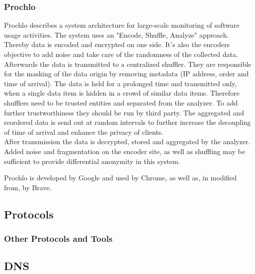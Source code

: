 \subsubsection{Prochlo}
    Prochlo describes a system architecture for large-scale monitoring of software usage activities. The system uses an "Encode, Shuffle, Analyze" approach. Thereby data is encoded and encrypted on one side. It's also the encoders objective to add noise and take care of the randomness of the collected data\cite{bittau_prochlo_2017}.\\
    Afterwards the data is transmitted to a centralized shuffler. They are responsible for the masking of the data origin by removing metadata (IP address, order and time of arrival).
    The data is held for a prolonged time and transmitted only, when a single data item is hidden in a crowd of similar data items. Therefore shufflers need to be trusted entities and separated from the analyzer\cite{bittau_prochlo_2017}. To add further trustworthiness they should be run by third party. The aggregated and reordered data is send out at random intervals to further increase the decoupling of time of arrival and enhance the privacy of clients.\\
    After transmission the data is decrypted, stored and aggregated by the analyzer. 
    Added noise and fragmentation on the encoder site, as well as shuffling may be sufficient to provide differential anonymity in this system.
    
    Prochlo is developed by Google and used by Chrome, as well as, in modified from, by Brave.

%
%
\subsection{Protocols}
\label{subsec:related:protocols}
%

\subsubsection{Other Protocols and Tools}


\subsection{DNS}




